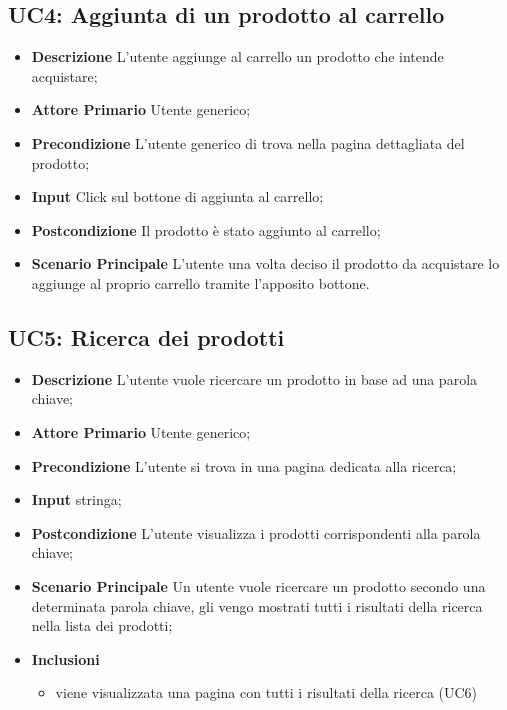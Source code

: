         \subsection{UC4: Aggiunta di un prodotto al carrello}
        \begin{itemize}
            \item \textbf{Descrizione} L'utente aggiunge al carrello un prodotto che intende acquistare;
            \item \textbf{Attore Primario} Utente generico;
            \item \textbf{Precondizione} L'utente generico di trova nella pagina dettagliata del prodotto;
            \item \textbf{Input} Click sul bottone di aggiunta al carrello;
            \item \textbf{Postcondizione} Il prodotto è stato aggiunto al carrello;
            \item \textbf{Scenario Principale} L'utente una volta deciso il prodotto da acquistare lo aggiunge al proprio carrello tramite l'apposito bottone.
        \end{itemize}
        \subsection{UC5: Ricerca dei prodotti}
        \begin{itemize}
            \item \textbf{Descrizione} L'utente vuole ricercare un prodotto in base ad una parola chiave; 
            \item \textbf{Attore Primario} Utente generico;
            \item \textbf{Precondizione} L'utente si trova in una pagina dedicata alla ricerca; 
            \item \textbf{Input} stringa;
            \item \textbf{Postcondizione} L'utente visualizza i prodotti corrispondenti alla parola chiave;
            \item \textbf{Scenario Principale} Un utente vuole ricercare un prodotto secondo una determinata parola chiave, gli vengo mostrati tutti i risultati della ricerca nella lista dei prodotti;
            \item \textbf{Inclusioni}
            \begin{itemize}
                \item viene visualizzata una pagina con tutti i risultati della ricerca (UC6)
            \end{itemize}
        \end{itemize}
